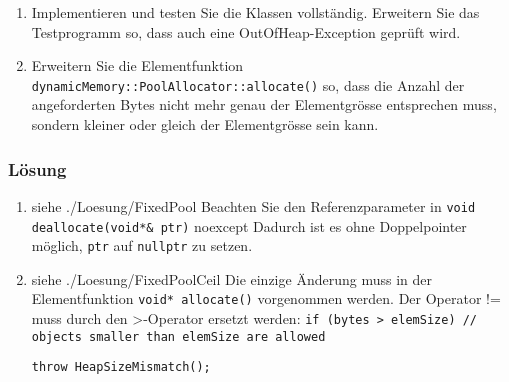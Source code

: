 \begin{enumerate}
  \item Implementieren und testen Sie die Klassen vollständig. Erweitern Sie das Testprogramm so, dass auch eine OutOfHeap-Exception geprüft wird.
\item Erweitern Sie die Elementfunktion \texttt{dynamicMemory::PoolAllocator::allocate()} so, dass die Anzahl der angeforderten Bytes nicht mehr genau der Elementgrösse entsprechen muss, sondern kleiner oder gleich der Elementgrösse sein kann.
\end{enumerate}

\subsubsection{Lösung}

\begin{enumerate}
  \item  siehe ./Loesung/FixedPool
Beachten Sie den Referenzparameter in
\texttt{void deallocate(void*\& ptr)} noexcept
Dadurch ist es ohne Doppelpointer möglich, \texttt{ptr} auf \texttt{nullptr} zu setzen.


\noindent\makebox[\linewidth]{\rule{\paperwidth}{0.4pt}}


\item  siehe ./Loesung/FixedPoolCeil
Die einzige Änderung muss in der Elementfunktion
\texttt{void* allocate()}
vorgenommen werden. Der Operator != muss durch den >-Operator ersetzt werden:
\texttt{if (bytes > elemSize) // objects smaller than elemSize are allowed}

\texttt{throw HeapSizeMismatch();}

\noindent\makebox[\linewidth]{\rule{\paperwidth}{0.4pt}}

\end{enumerate}


